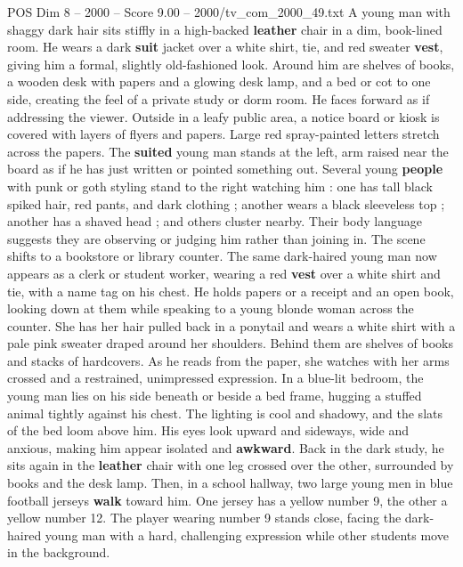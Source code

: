 \begin{textsample}{POS Dim 8 – 2000 – Score 9.00 – 2000/tv\_com\_2000\_49.txt}  \label{ex:f8_pos_009}
A young man with shaggy dark hair sits stiffly in a high-backed \textbf{leather} chair in a dim, book-lined room.
He wears a dark \textbf{suit} jacket over a white shirt, tie, and red sweater \textbf{vest}, giving him a formal, slightly old-fashioned look.
Around him are shelves of books, a wooden desk with papers and a glowing desk lamp, and a bed or cot to one side, creating the feel of a private study or dorm room.
He faces forward as if addressing the viewer.
Outside in a leafy public area, a notice board or kiosk is covered with layers of flyers and papers.
Large red spray-painted letters stretch across the papers.
The \textbf{suited} young man stands at the left, arm raised near the board as if he has just written or pointed something out.
Several young \textbf{people} with punk or goth styling stand to the right watching him : one has tall black spiked hair, red pants, and dark clothing ; another wears a black sleeveless top ; another has a shaved head ; and others cluster nearby.
Their body language suggests they are observing or judging him rather than joining in.
The scene shifts to a bookstore or library counter.
The same dark-haired young man now appears as a clerk or student worker, wearing a red \textbf{vest} over a white shirt and tie, with a name tag on his chest.
He holds papers or a receipt and an open book, looking down at them while speaking to a young blonde woman across the counter.
She has her hair pulled back in a ponytail and wears a white shirt with a pale pink sweater draped around her shoulders.
Behind them are shelves of books and stacks of hardcovers.
As he reads from the paper, she watches with her arms crossed and a restrained, unimpressed expression.
In a blue-lit bedroom, the young man lies on his side beneath or beside a bed frame, hugging a stuffed animal tightly against his chest.
The lighting is cool and shadowy, and the slats of the bed loom above him.
His eyes look upward and sideways, wide and anxious, making him appear isolated and \textbf{awkward}.
Back in the dark study, he sits again in the \textbf{leather} chair with one leg crossed over the other, surrounded by books and the desk lamp.
Then, in a school hallway, two large young men in blue football jerseys \textbf{walk} toward him.
One jersey has a yellow number 9, the other a yellow number 12.
The player wearing number 9 stands close, facing the dark-haired young man with a hard, challenging expression while other students move in the background.

\end{textsample}
